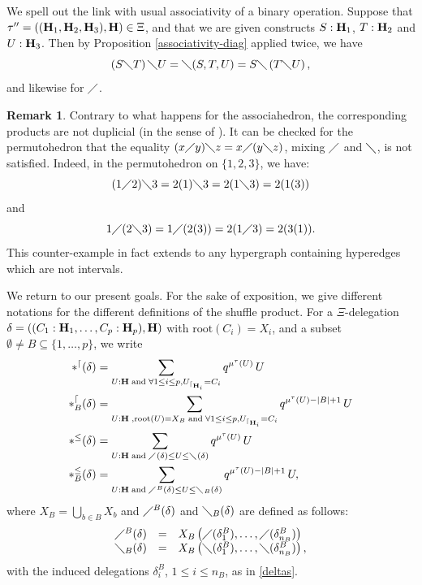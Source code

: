\documentclass{article}
\theoremstyle{plain}
\theoremstyle{definition}
\newtheorem{remark}[thm]{Remark}
\newcommand{\hyper}[1]{{\bf #1}}
\newcommand{\restrconstr}[2]{{#1}_{\lceil_{#2}}}
\begin{document}
We spell out the link with usual associativity of a binary operation. Suppose that $\tau'' = ((\hyper{H}_1, \hyper{H}_2, \hyper{H}_3),\hyper{H})\in \Xi$, and that we are given constructs $S:\hyper{H}_1$, $T:\hyper{H}_2$ and $U:\hyper{H}_3$. Then by Proposition \ref{associativity-diag} applied twice, we have
$$
 \left( S \diagdown T \right) \diagdown U = \diagdown(S,T,U) = S \diagdown \left(T \diagdown U\right),
$$
and likewise for $\diagup$.


\begin{remark}
Contrary to what happens for the associahedron, the corresponding products are not duplicial (in the sense of \cite[Definition 5.1.1]{L08}). It can be checked for the permutohedron that the equality $(x \diagup y)\diagdown z = x\diagup(y\diagdown z)$, mixing $\diagup$ and $\diagdown$, is not satisfied. Indeed, in the permutohedron on $\{1,2,3\}$, we have:
$$
 (1\diagup 2) \diagdown 3 =2(1) \diagdown 3 = 2(1 \diagdown 3) = 2(1(3))
$$
and 
$$
 1\diagup (2 \diagdown 3) = 1\diagup (2(3))=2(1 \diagup 3) = 2(3(1)).
$$
This counter-example in fact extends to any hypergraph containing hyperedges which are not intervals.
\end{remark}

We return to our present goals.
For the sake of exposition, we give different notations for the different definitions of the shuffle product.
For a $\Xi$-delegation $\delta=((C_1:{\bf H}_1,\dots, C_p:{\bf H}_p),{\bf H})$ with $\text{root}(C_i)=X_i$, and a subset $\emptyset\neq B\subseteq \{1,\dots,p\}$, we write
\begin{align}
 \ast^{\lceil}(\delta) &=\sum_{U:\hyper{H} \;{\rm and}\; \forall 1\leq i\leq p, \restrconstr{U}{\hyper{H}_i}=C_i} q^{\mu^\tau(U)}\, U \label{prc}\\
\ast_B^{\lceil}(\delta)&= \sum_{U:\hyper{H} \;, {\rm root}(U)=X_B \; {\rm and}\; \forall 1\leq i\leq p, \restrconstr{U}{\hyper{H}_i}=C_i} q^{\mu^\tau(U)-|B|+1}\, U\\
\ast^\leq(\delta) &= \sum_{U:\hyper{H} \;{\rm and}\; \diagup(\delta) \leq U \leq\diagdown(\delta)} q^{\mu^\tau(U)}\, U \\
\ast^\leq_B(\delta) &= \sum_{U:\hyper{H} \;{\rm and}\; \diagup^B(\delta) \leq U \leq\diagdown_B(\delta)} q^{\mu^\tau(U)-|B|+1}\, U,
\end{align}
where $X_B=\bigcup_{b \in B} X_b$ and $\diagup^B(\delta)$ and $\diagdown_B(\delta)$ are defined as follows:
$$\begin{array}{lll}
\diagup^B(\delta)& = & X_B\left(\diagup(\delta^B_1), \ldots, \diagup(\delta^B_{n_B}) \right)\\
\diagdown_B(\delta) & = & X_B\left(\diagdown(\delta^B_1), \ldots, \diagdown(\delta^B_{n_B}) \right),
\end{array}$$
with the induced delegations $\delta_i^B$, $1\leq i\leq n_B$, as in \eqref{deltas}.
\end{document}
